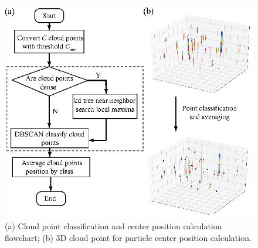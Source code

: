 \documentclass[draftthesis,fullpage]{uiucthesis}
\begin{document}
       
\begin{figure}[h]
       \centerline{\includegraphics[width=0.7\linewidth]{fig/figure3.eps}}
       \caption{(a) Cloud point classification and center position calculation flowchart; (b) 3D cloud point for particle center position calculation.}
       \label{fig:flowchart}
\end{figure}
\end{document}
